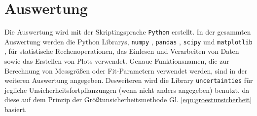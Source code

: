 \section{Auswertung}
\label{sec:auswertung}
Die Auswertung wird mit der Skriptingsprache \verb|Python| \cite{PYTHON} erstellt.
In der gesammten Auswertung werden die Python Librarys, \verb|numpy| \cite{harris2020array}, \verb|pandas| \cite{reback2020pandas}, \verb|scipy| \cite{2020SciPy-NMeth} und \verb|matplotlib| \cite{Hunter:2007}, für statistische Rechenoperationen, das Einlesen und Verarbeiten von Daten sowie das Erstellen von Plots verwendet.
Genaue Funktionsnamen, die zur Berechnung von Messgrößen oder Fit-Parametern verwendet werden, sind in der weiteren Auswertung angegeben.
Desweiteren wird die Library \verb|uncertainties| \cite{UN} für jegliche Unsicherheitsfortpflanzungen (wenn nicht anders angegeben) benutzt, da diese auf dem Prinzip der Größtunsicherheitsmethode Gl. \ref{equ:groestunsicherheit} basiert.
